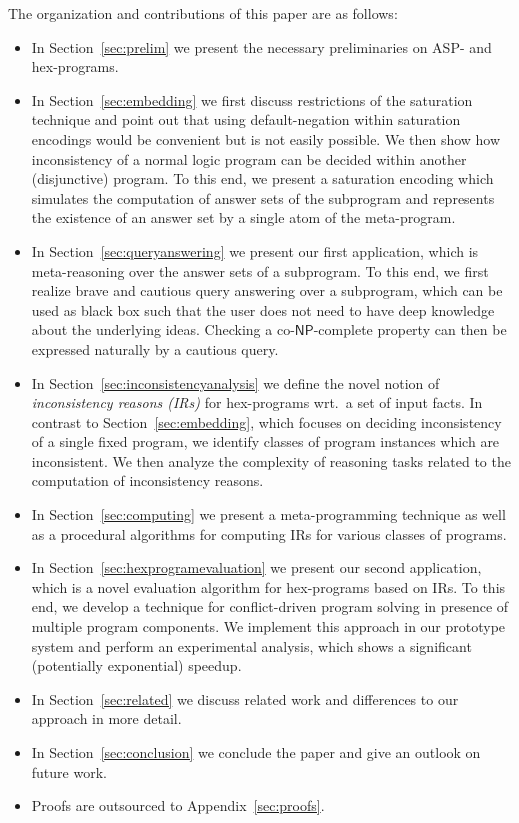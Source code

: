 \documentclass[11pt,fleqn,twoside]{article}
\newcommand\hex{{\sc hex}\xspace}
\newcommand{\conp}{co-\ensuremath{\mathsf{NP}}\xspace}
\begin{document}
		The organization and contributions of this paper are as follows:
		\begin{itemize}
			\item In Section~\ref{sec:prelim} we present the necessary preliminaries on ASP- and \hex-programs.
			\item In Section~\ref{sec:embedding} we first discuss restrictions of the saturation technique and point out that using default-negation within
				saturation encodings would be convenient but is not easily possible.
				We then show how inconsistency of a normal logic program can be decided within another (disjunctive) program.
				To this end, we present a saturation encoding which simulates the computation of answer sets of the subprogram and represents the existence of
				an answer set by a single atom of the meta-program.
			\item In Section~\ref{sec:queryanswering} we present our first application, which is meta-reasoning over the answer sets of a subprogram.
				To this end, we first realize brave and cautious query answering over a subprogram,
				which can be used as black box such that the user does not need to have deep knowledge about the underlying ideas.
				Checking a \conp-complete property can then be expressed naturally by a cautious query.
			\item In Section~\ref{sec:inconsistencyanalysis} we define the novel notion of \emph{inconsistency reasons (IRs)} for \hex-programs
				wrt.~a set of input facts.
				In contrast to Section~\ref{sec:embedding}, which focuses on deciding inconsistency of a single fixed program, we identify classes of program instances
				which are inconsistent.
				We then analyze the complexity of reasoning tasks related to the computation of inconsistency reasons.
			\item In Section~\ref{sec:computing} we present a meta-programming technique as well as a procedural algorithms for computing IRs
				for various classes of programs.
			\item In Section~\ref{sec:hexprogramevaluation} we present our second application, which is a novel evaluation algorithm for \hex-programs based on IRs.
				To this end, we develop a technique for
				conflict-driven program solving in presence of multiple program components. We implement this approach in our prototype system
				and perform an experimental analysis, which shows a significant (potentially exponential) speedup.
			\item In Section~\ref{sec:related} we discuss related work and differences to our approach in more detail.
			\item In Section~\ref{sec:conclusion} we conclude the paper and give an outlook on future work.
			\item Proofs are outsourced to Appendix~\ref{sec:proofs}.
		\end{itemize}
		
\end{document}
